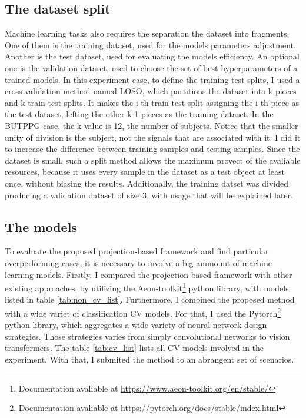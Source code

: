 \subsection{The dataset split}

Machine learning tasks also requires the separation the dataset into fragments. One of them is the training dataset, used for the models parameters adjustment. Another is the test dataset, used for evaluating the models efficiency. An optional one is the validation dataset, used to choose the set of best hyperparameters of a trained models. In this experiment case, to define the training-test splits, I used a cross validation method named \acrfull{LOSO}, which partitions the dataset into k pieces and k train-test splits. It makes the i-th train-test split assigning the i-th piece as the test dataset, lefting the other k-1 pieces as the training dataset. In the \acrshort{BUTPPG} case, the k value is 12, the number of subjects. Notice that the smaller unity of division is the subject, not the signals that are associated with it. I did it to increase the difference between training samples and testing samples. Since the dataset is small, such a split method allows the maximum provect of the avaliable resources, because it uses every sample in the dataset as a test object at least once, without biasing the results. Additionally, the training datset was divided producing a validation dataset of size 3, with usage that will be explained later.

\subsection{The models}

To evaluate the proposed projection-based framework and find particular overperforming cases, it is necessary to involve a big ammount of machine learning models. Firstly, I compared the projection-based framework with other existing approaches, by utilizing the Aeon-toolkit\footnote{Documentation avaliable at \url{https://www.aeon-toolkit.org/en/stable/}} python library, with models listed in table \ref{tab:non_cv_list}. Furthermore, I combined the proposed method with a wide variet of classification \acrshort{CV} models. For that, I used the Pytorch\footnote{Documentation avaliable at \url{https://pytorch.org/docs/stable/index.html}} python library, which aggregates a wide variety of neural network design strategies. Those strategies varies from simply convolutional networks to vision transformers. The table \ref{tab:cv_list} lists all \acrshort{CV} models involved in the experiment. With that, I submited the method to an abrangent set of scenarios.

